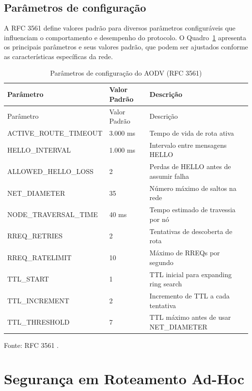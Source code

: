 \subsection{Parâmetros de
configuração}\label{paruxe2metros-de-configurauxe7uxe3o}

A RFC 3561 define valores padrão para diversos parâmetros configuráveis
que influenciam o comportamento e desempenho do protocolo. O Quadro~\ref{quadro:aodv-params}
apresenta os principais parâmetros e seus valores padrão, que podem ser
ajustados conforme as características específicas da rede.

{\def\LTcaptype{quadro}
\begin{longtable}[]{@{}lll@{}}
\caption{Parâmetros de configuração do AODV (RFC 3561)}\label{quadro:aodv-params}\\
\toprule\noalign{}
Parâmetro & Valor Padrão & Descrição \\
\midrule\noalign{}
\endfirsthead
\toprule\noalign{}
Parâmetro & Valor Padrão & Descrição \\
\midrule\noalign{}
\endhead
\bottomrule\noalign{}
\endlastfoot
ACTIVE\_ROUTE\_TIMEOUT & 3.000 ms & Tempo de vida de rota ativa \\
HELLO\_INTERVAL & 1.000 ms & Intervalo entre mensagens HELLO \\
ALLOWED\_HELLO\_LOSS & 2 & Perdas de HELLO antes de assumir falha \\
NET\_DIAMETER & 35 & Número máximo de saltos na rede \\
NODE\_TRAVERSAL\_TIME & 40 ms & Tempo estimado de travessia por nó \\
RREQ\_RETRIES & 2 & Tentativas de descoberta de rota \\
RREQ\_RATELIMIT & 10 & Máximo de RREQs por segundo \\
TTL\_START & 1 & TTL inicial para expanding ring search \\
TTL\_INCREMENT & 2 & Incremento de TTL a cada tentativa \\
TTL\_THRESHOLD & 7 & TTL máximo antes de usar NET\_DIAMETER \\
\end{longtable}
}

Fonte: RFC 3561 \cite{perkins2003}.

\section{Segurança em Roteamento Ad-Hoc}\label{seguranca-roteamento-ad-hoc}

